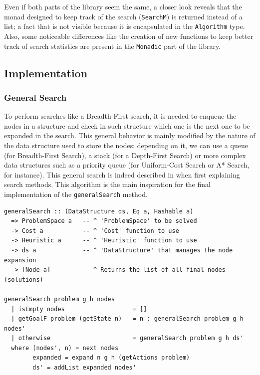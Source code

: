 Even if both parts of the library seem the same, a closer look reveals that the
monad designed to keep track of the search (\texttt{SearchM}) is returned
instead of a list; a fact that is not visible because it is encapsulated in the
\texttt{Algorithm} type. Also, some noticeable differences like the creation of
new functions to keep better track of search statistics are present in the
\texttt{Monadic} part of the library.\\


\subsection{Implementation}

\subsubsection{General Search}

To perform searches like a Breadth-First search, it is needed to enqueue the
nodes in a structure and check in such structure which one is the next one to
be expanded in the search. This general behavior is mainly modified by the
nature of the data structure used to store the nodes: depending on it, we can
use a queue (for Breadth-First Search), a stack (for a Depth-First Search) or
more complex data structures such as a priority queue (for Uniform-Cost Search
or A* Search, for instance). This general search is indeed described in
\cite{rusell-2003-aima} when first explaining search methods. This algorithm
is the main inspiration for the final implementation of the
\texttt{generalSearch} method.\\

\begin{lstlisting}[style=haskell,
caption=Pure \texttt{generalSearch} implementation, label=pure:general]
generalSearch :: (DataStructure ds, Eq a, Hashable a)
  => ProblemSpace a   -- ^ 'ProblemSpace' to be solved
  -> Cost a           -- ^ 'Cost' function to use
  -> Heuristic a      -- ^ 'Heuristic' function to use
  -> ds a             -- ^ 'DataStructure' that manages the node expansion
  -> [Node a]         -- ^ Returns the list of all final nodes (solutions)

generalSearch problem g h nodes
  | isEmpty nodes                   = []
  | getGoalF problem (getState n)   = n : generalSearch problem g h nodes'
  | otherwise                       = generalSearch problem g h ds'
  where (nodes', n) = next nodes
        expanded = expand n g h (getActions problem)
        ds' = addList expanded nodes'
\end{lstlisting}

